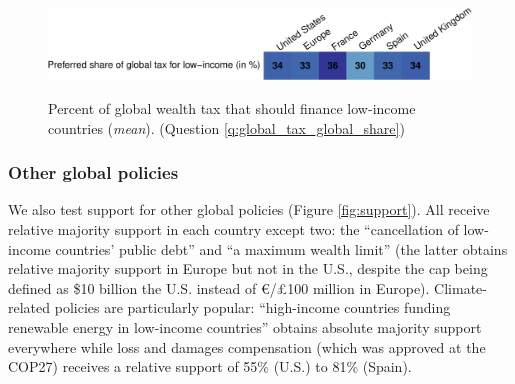 \begin{figure}
    \centering 
    \caption[Preferred share of wealth tax for low-income countries]{Percent of global wealth tax that should finance low-income countries (\textit{mean}). (Question \ref{q:global_tax_global_share})} %
    \includegraphics[width=1\textwidth]{../figures/country_comparison/global_tax_global_share_mean.pdf} \label{fig:global_share_mean}
\end{figure}

\subsubsection{Other global policies} %
We also test support for other %
global policies (Figure \ref{fig:support}). All receive relative majority support in each country except two:  the ``cancellation of low-income countries' public debt'' and ``a maximum wealth limit'' (the latter obtains relative majority support in Europe but not in the U.S., despite the cap being defined as \$10 billion the U.S. instead of \euro{}/£100 million in Europe). Climate-related policies are particularly popular: ``high-income countries funding renewable energy in low-income countries'' obtains absolute majority support everywhere while loss and damages compensation (which was approved at the COP27) receives a relative support of 55\% (U.S.) to 81\% (Spain).

